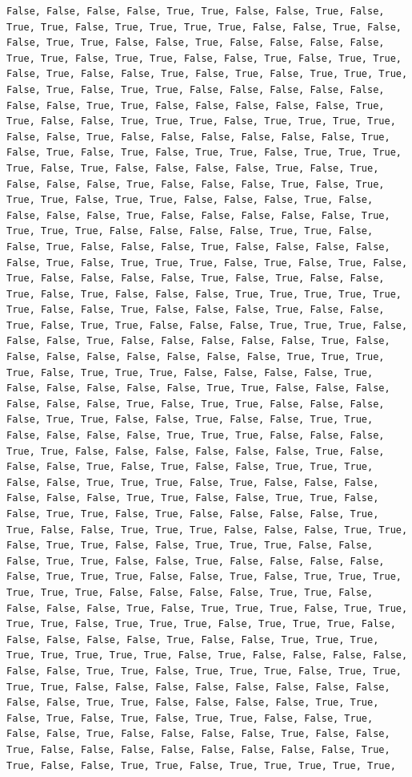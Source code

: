 \documentclass[
  letterpaper,
  DIV=11,
  numbers=noendperiod]{scrartcl}
\begin{document}
\begin{verbatim}
False, False, False, False, True, True, False, False, True, False, True, True, False, True, True, True, True, False, False, True, False, False, True, True, False, False, True, False, False, False, False, True, True, False, True, True, False, False, True, False, True, True, False, True, False, False, True, False, True, False, True, True, True, False, True, False, True, True, False, False, False, False, False, False, False, True, True, False, False, False, False, False, True, True, False, False, True, True, True, False, True, True, True, True, False, False, True, False, False, False, False, False, False, True, False, True, False, True, False, True, True, False, True, True, True, True, False, True, False, False, False, False, True, False, True, False, False, False, True, False, False, False, True, False, True, True, True, False, True, True, False, False, False, True, False, False, False, False, True, False, False, False, False, False, True, True, True, True, False, False, False, False, True, True, False, False, True, False, False, False, True, False, False, False, False, False, True, False, True, True, True, False, True, False, True, False, True, False, False, False, False, True, False, True, False, False, True, False, True, False, False, False, True, True, True, True, True, True, False, False, True, False, False, False, True, False, False, True, False, True, True, False, False, False, True, True, True, False, False, False, True, False, False, False, False, False, True, False, False, False, False, False, False, False, False, True, True, True, True, False, True, True, True, False, False, False, False, True, False, False, False, False, False, True, True, False, False, False, False, False, False, True, False, True, True, False, False, False, False, True, True, False, False, True, False, False, True, True, False, False, False, False, True, True, True, False, False, False, True, True, False, False, False, False, False, False, True, False, False, False, True, False, True, False, False, True, True, True, False, False, True, True, True, False, True, False, False, False, False, False, False, True, True, False, False, True, True, False, False, True, True, False, True, False, False, False, False, True, True, False, False, True, True, True, False, False, False, True, True, False, True, True, False, False, True, True, True, False, False, False, True, True, False, False, True, False, False, False, False, False, True, True, True, False, False, True, False, True, True, True, True, True, True, False, False, False, False, True, True, False, False, False, False, True, False, True, True, True, False, True, True, True, True, False, True, True, True, False, True, True, True, False, False, False, False, False, True, False, False, True, True, True, True, True, True, True, True, False, True, False, False, False, False, False, False, True, True, False, True, True, True, False, True, True, True, True, False, False, False, False, False, False, False, False, False, False, True, True, False, False, False, False, True, True, False, True, False, True, False, True, True, False, False, True, False, False, True, False, False, False, False, True, False, False, True, False, False, False, False, False, False, False, False, True, True, False, False, True, True, False, True, True, True, True, True, 
\end{verbatim}
\end{document}
